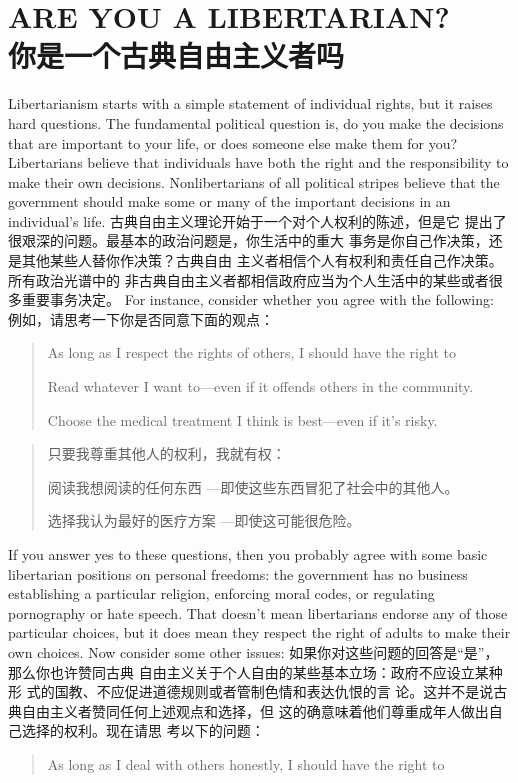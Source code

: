 \chapter*{ARE YOU A LIBERTARIAN?\\你是一个古典自由主义者吗}
\begin{paracol}{2}

Libertarianism starts with a simple statement of individual rights, but it raises hard questions. The fundamental political question is, do you make the decisions that are
important to your life, or does someone else make them for
you? Libertarians believe that individuals have both the right
and the responsibility to make their own decisions. Nonlibertarians of all political stripes believe that the government
should make some or many of the important decisions in an individual's life.
\switchcolumn
古典自由主义理论开始于一个对个人权利的陈述，但是它
提出了很艰深的问题。最基本的政治问题是，你生活中的重大
事务是你自己作决策，还是其他某些人替你作决策？古典自由
主义者相信个人有权利和责任自己作决策。所有政治光谱中的
非古典自由主义者都相信政府应当为个人生活中的某些或者很
多重要事务决定。
\switchcolumn*
For instance, consider whether you agree with the following:
\switchcolumn
例如，请思考一下你是否同意下面的观点：
\switchcolumn*
\begin{quotation}
\noindent As long as I respect the rights of others, I should have the
right to

Read whatever I want to---even if it offends others in the
community.

Choose the medical treatment I think is best---even if it's
risky.
\end{quotation}
\switchcolumn
\begin{quotation}
\noindent 只要我尊重其他人的权利，我就有权：

阅读我想阅读的任何东西 ---即使这些东西冒犯了社会中的其他人。

选择我认为最好的医疗方案 ---即使这可能很危险。
\end{quotation}
\switchcolumn*
If you answer yes to these questions, then you probably
agree with some basic libertarian positions on personal freedoms: the government has no business establishing a particular religion, enforcing moral codes, or regulating pornography
or hate speech. That doesn't mean libertarians endorse any of those particular choices, but it does mean they respect the
right of adults to make their own choices. Now consider some
other issues:
\switchcolumn
如果你对这些问题的回答是“是”，那么你也许赞同古典
自由主义关于个人自由的某些基本立场：政府不应设立某种形
式的国教、不应促进道德规则或者管制色情和表达仇恨的言
论。这并不是说古典自由主义者赞同任何上述观点和选择，但
这的确意味着他们尊重成年人做出自己选择的权利。现在请思
考以下的问题：
\switchcolumn*
\begin{quotation}
\noindent As long as I deal with others honestly, I should have the right to
	

\end{quotation}
\end{paracol}
